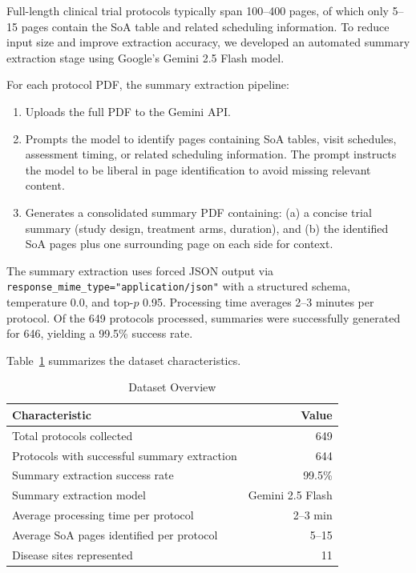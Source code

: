 \documentclass[11pt]{article}
\begin{document}
Full-length clinical trial protocols typically span 100--400 pages, of which only 5--15 pages contain the SoA table and related scheduling information. To reduce input size and improve extraction accuracy, we developed an automated summary extraction stage using Google's Gemini 2.5 Flash model.

For each protocol PDF, the summary extraction pipeline:
\begin{enumerate}[leftmargin=*]
    \item Uploads the full PDF to the Gemini API.
    \item Prompts the model to identify pages containing SoA tables, visit schedules, assessment timing, or related scheduling information. The prompt instructs the model to be liberal in page identification to avoid missing relevant content.
    \item Generates a consolidated summary PDF containing: (a) a concise trial summary (study design, treatment arms, duration), and (b) the identified SoA pages plus one surrounding page on each side for context.
\end{enumerate}

The summary extraction uses forced JSON output via \texttt{response\_mime\_type="application/json"} with a structured schema, temperature 0.0, and top-$p$ 0.95. Processing time averages 2--3 minutes per protocol. Of the 649 protocols processed, summaries were successfully generated for 646, yielding a 99.5\% success rate.

Table~\ref{tab:dataset_overview} summarizes the dataset characteristics.

\begin{table}[H]
\centering
\caption{Dataset Overview}
\label{tab:dataset_overview}
\begin{tabular}{lr}
\toprule
\textbf{Characteristic} & \textbf{Value} \\
\midrule
Total protocols collected & 649 \\
Protocols with successful summary extraction & 644 \\
Summary extraction success rate & 99.5\% \\
Summary extraction model & Gemini 2.5 Flash \\
Average processing time per protocol & 2--3 min \\
Average SoA pages identified per protocol & 5--15 \\
Disease sites represented & 11 \\
\bottomrule
\end{tabular}
\end{table}
\end{document}
